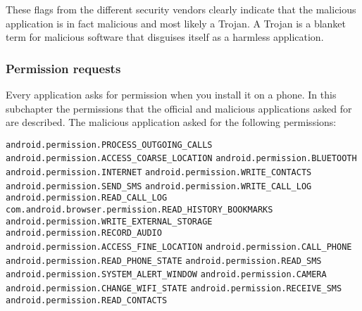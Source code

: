 These flags from the different security vendors clearly indicate that the malicious application is in fact malicious and most likely a Trojan.
A Trojan is a blanket term for malicious software that disguises itself as a harmless application.
\newpage
\subsubsection{Permission requests}
Every application asks for permission when you install it on a phone.
In this subchapter the permissions that the official and malicious applications asked for are described.
The malicious application asked for the following permissions:

\texttt{android.permission.PROCESS\_OUTGOING\_CALLS}
\newline \texttt{android.permission.ACCESS\_COARSE\_LOCATION}
\newline \texttt{android.permission.BLUETOOTH}
\newline \texttt{android.permission.INTERNET}
\newline \texttt{android.permission.WRITE\_CONTACTS}
\newline \texttt{android.permission.SEND\_SMS}
\newline \texttt{android.permission.WRITE\_CALL\_LOG}
\newline \texttt{android.permission.READ\_CALL\_LOG}
\newline \texttt{com.android.browser.permission.READ\_HISTORY\_BOOKMARKS}
\newline \texttt{android.permission.WRITE\_EXTERNAL\_STORAGE}
\newline \texttt{android.permission.RECORD\_AUDIO}
\newline \texttt{android.permission.ACCESS\_FINE\_LOCATION}
\newline \texttt{android.permission.CALL\_PHONE}
\newline \texttt{android.permission.READ\_PHONE\_STATE}
\newline \texttt{android.permission.READ\_SMS}
\newline \texttt{android.permission.SYSTEM\_ALERT\_WINDOW}
\newline \texttt{android.permission.CAMERA}
\newline \texttt{android.permission.CHANGE\_WIFI\_STATE}
\newline \texttt{android.permission.RECEIVE\_SMS}
\newline \texttt{android.permission.READ\_CONTACTS}
